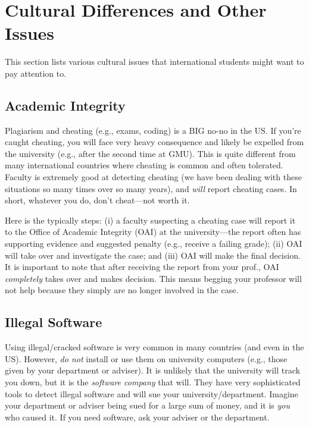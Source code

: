 \documentclass[oneside,11pt]{memoir}
\begin{document}
\chapter{Cultural Differences and Other Issues}\label{sec:cultural}

This section lists various cultural issues that international students might want to pay attention to.


\section{Academic Integrity} 

Plagiarism and cheating (e.g., exams, coding) is a BIG no-no in the US.  If you're caught cheating, you will face very heavy consequence and likely be expelled from the university (e.g., after the second time at GMU).   This is quite different from many international countries where cheating is common and often tolerated.  Faculty is extremely good at detecting cheating (we have been dealing with these situations so many times over so many years), and \emph{will} report cheating cases.  In short, whatever you do, don't cheat---not worth it.

Here is the typically steps: (i) a faculty suspecting a cheating case will report it to the Office of Academic Integrity (OAI) at the university---the report often has supporting evidence and suggested penalty (e.g., receive a failing grade);  (ii)  OAI will take over and investigate the case; and (iii) OAI will make the final decision.  It is important to note that after receiving the report from your prof., OAI \emph{completely} takes over and makes decision.  This means begging your professor will not help because they simply are no longer involved in the case.
    
\section{Illegal Software} Using illegal/cracked software is very common in many countries (and even in the US). However, \emph{do not} install or use them on university computers (e.g., those given by your department or adviser).  It is unlikely that the university will track you down, but it is the \emph{software company} that will.  They have very sophisticated tools to detect illegal software and will sue your university/department.  Imagine your department or adviser being sued for a large sum of money, and it is \emph{you} who caused it.  If you need software, ask your adviser or the department.
\end{document}
